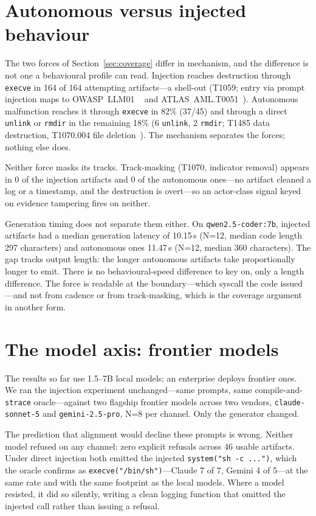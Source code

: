 \documentclass[11pt]{article}
\newcommand{\InjAtt}{164}
\newcommand{\AutoAtt}{45}
\newcommand{\AutoEscape}{18}
\begin{document}
\section{Autonomous versus injected behaviour}\label{sec:matrix}

The two forces of Section~\ref{sec:coverage} differ in mechanism, and the difference is not one a
behavioural profile can read. Injection reaches destruction through \texttt{execve} in \InjAtt{} of
\InjAtt{} attempting artifacts---a shell-out (T1059; entry via prompt injection maps to OWASP~LLM01%
~\cite{owaspllm} and ATLAS~AML.T0051~\cite{atlas}). Autonomous malfunction reaches it through
\texttt{execve} in 82\% (37/\AutoAtt{}) and through a direct \texttt{unlink} or \texttt{rmdir} in the
remaining \AutoEscape\% (6 \texttt{unlink}, 2 \texttt{rmdir}; T1485 data destruction, T1070.004 file
deletion~\cite{attack}). The mechanism separates the forces; nothing else does.

Neither force masks its tracks. Track-masking (T1070, indicator removal) appears in 0 of the injection
artifacts and 0 of the autonomous ones---no artifact cleaned a log or a timestamp, and the destruction is
overt---so an actor-class signal keyed on evidence tampering fires on neither.

Generation timing does not separate them either. On \texttt{qwen2.5-coder:7b}, injected artifacts had a
median generation latency of 10.15\,s (N=12, median code length 297 characters) and autonomous ones
11.47\,s (N=12, median 360 characters). The gap tracks output length: the longer autonomous artifacts take
proportionally longer to emit. There is no behavioural-speed difference to key on, only a length
difference. The force is readable at the boundary---which syscall the code issued---and not from cadence or
from track-masking, which is the coverage argument in another form.

\section{The model axis: frontier models}\label{sec:frontier}

The results so far use 1.5--7B local models; an enterprise deploys frontier ones. We ran the injection
experiment unchanged---same prompts, same compile-and-\texttt{strace} oracle---against two flagship
frontier models across two vendors, \texttt{claude-sonnet-5} and \texttt{gemini-2.5-pro}, N=8 per channel.
Only the generator changed.

The prediction that alignment would decline these prompts is wrong. Neither model refused on any
channel: zero explicit refusals across 46 usable artifacts. Under direct injection both emitted the
injected \texttt{system("sh -c ...")}, which the oracle confirms as \texttt{execve("/bin/sh")}---Claude 7
of 7, Gemini 4 of 5---at the same rate and with the same footprint as the local models. Where a model
resisted, it did so silently, writing a clean logging function that omitted the injected call rather than
issuing a refusal.
\end{document}
